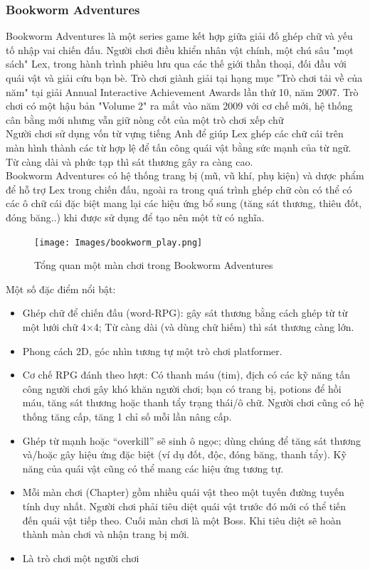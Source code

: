\subsubsection{Bookworm Adventures}
\hspace*{0.5cm} Bookworm Adventures là một series game kết hợp giữa giải đố ghép chữ và yếu tố nhập vai chiến đấu. Người chơi điều khiển nhân vật chính, một chú sâu "mọt sách" Lex, trong hành trình phiêu lưu qua các thế giới thần thoại, đối đầu với quái vật và giải cứu bạn bè. Trò chơi giành giải tại hạng mục "Trò chơi tải về của năm" tại giải Annual Interactive Achievement Awards lần thứ 10, năm 2007. Trò chơi có một hậu bản "Volume 2" ra mắt vào năm 2009 với cơ chế mới, hệ thống cân bằng mới nhưng vẫn giữ nòng cốt của một trò chơi xếp chữ\\
\hspace*{0.5cm} Người chơi sử dụng vốn từ vựng tiếng Anh để giúp Lex ghép các chữ cái trên màn hình thành các từ hợp lệ để tấn công quái vật bằng sức mạnh của từ ngữ. Từ càng dài và phức tạp thì sát thương gây ra càng cao.\\
\hspace*{0.5cm} Bookworm Adventures có hệ thống trang bị (mũ, vũ khí, phụ kiện) và dược phẩm để hỗ trợ Lex trong chiến đấu, ngoài ra trong quá trình ghép chữ còn có thể có các ô chữ cái đặc biệt mang lại các hiệu ứng bổ sung (tăng sát thương, thiêu đốt, đóng băng..) khi được sử dụng để tạo nên một từ có nghĩa.
\begin{figure}[H]
	\centering
	\texttt{[image: Images/bookworm\_play.png]}
	\vspace{0.5cm}
	\caption{Tổng quan một màn chơi trong Bookworm Adventures}
\end{figure}
\hspace*{0.5cm} Một số đặc điểm nổi bật:
\begin{itemize}
	\item Ghép chữ để chiến đấu (word-RPG): gây sát thương bằng cách ghép từ từ một lưới chữ 4×4; Từ càng dài (và dùng chữ hiếm) thì sát thương càng lớn.
	\item Phong cách 2D, góc nhìn tương tự một trò chơi platformer.
	\item Cơ chế RPG đánh theo lượt: Có thanh máu (tim), địch có các kỹ năng tấn công người chơi gây khó khăn người chơi; bạn có trang bị, potions để hồi máu, tăng sát thương hoặc thanh tẩy trạng thái/ô chữ. Người chơi cũng có hệ thống tăng cấp, tăng 1 chỉ số mỗi lần nâng cấp.
	\item Ghép từ mạnh hoặc “overkill” sẽ sinh ô ngọc; dùng chúng để tăng sát thương và/hoặc gây hiệu ứng đặc biệt (ví dụ đốt, độc, đóng băng, thanh tẩy). Kỹ năng của quái vật cũng có thể mang các hiệu ứng tương tự.
	\item Mỗi màn chơi (Chapter) gồm nhiều quái vật theo một tuyến đường tuyến tính duy nhất. Người chơi phải tiêu diệt quái vật trước đó mới có thể tiến đến quái vật tiếp theo. Cuối màn chơi là một Boss. Khi tiêu diệt sẽ hoàn thành màn chơi và nhận trang bị mới.
	\item Là trò chơi một người chơi
\end{itemize}
